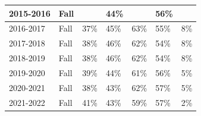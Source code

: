 \documentclass[10]{article}
\begin{document}
\begin{longtable}[c]{|l|l|ll|ll|l|}
	2015-2016                                                     & Fall                                                & \multicolumn{1}{l|}{}                     & 44\%                                     & \multicolumn{1}{l|}{}                     & 56\%                                     &                                                                                          \\ \hline
	2016-2017                                                     & Fall                                                & \multicolumn{1}{l|}{37\%}                 & 45\%                                     & \multicolumn{1}{l|}{63\%}                 & 55\%                                     & 8\%                                                                                      \\ \hline
	2017-2018                                                     & Fall                                                & \multicolumn{1}{l|}{38\%}                 & 46\%                                     & \multicolumn{1}{l|}{62\%}                 & 54\%                                     & 8\%                                                                                      \\ \hline
	2018-2019                                                     & Fall                                                & \multicolumn{1}{l|}{38\%}                 & 46\%                                     & \multicolumn{1}{l|}{62\%}                 & 54\%                                     & 8\%                                                                                      \\ \hline
	2019-2020                                                     & Fall                                                & \multicolumn{1}{l|}{39\%}                 & 44\%                                     & \multicolumn{1}{l|}{61\%}                 & 56\%                                     & 5\%                                                                                      \\ \hline
	2020-2021                                                     & Fall                                                & \multicolumn{1}{l|}{38\%}                 & 43\%                                     & \multicolumn{1}{l|}{62\%}                 & 57\%                                     & 5\%                                                                                      \\ \hline
	2021-2022                                                     & Fall                                                & \multicolumn{1}{l|}{41\%}                 & 43\%                                     & \multicolumn{1}{l|}{59\%}                 & 57\%                                     & 2\%                                                                                      \\ \hline
\end{longtable}
\end{document}
